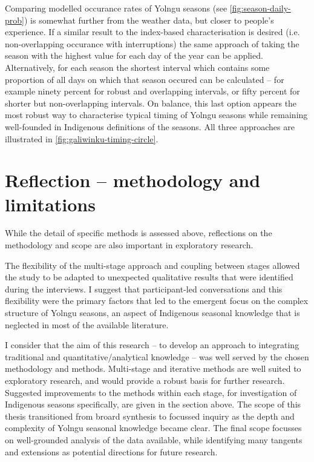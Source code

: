 Comparing modelled occurance rates of Yolngu seasons (see \cref{fig:season-daily-prob}) is somewhat
further from the weather data, but closer to people's experience.  If a similar
result to the index-based characterisation is desired (i.e. non-overlapping occurance
with interruptions) the same approach of taking the season
with the highest value for each day of the year can be applied.
%
Alternatively, for each season the shortest interval which contains some
proportion of all days on which that season occured can be calculated --
for example ninety percent for robust and overlapping intervals, or fifty percent for
shorter but non-overlapping intervals.  On balance, this last option
appears the most robust way to characterise typical timing of Yolngu seasons while
remaining well-founded in Indigenous definitions of the seasons.
%
All three approaches are illustrated in \cref{fig:galiwinku-timing-circle}.



\section{Reflection -- methodology and limitations}
\label{sec:disc-reflection}

While the detail of specific methods is assessed above, reflections on the
methodology and scope are also important in exploratory research.

The flexibility of the multi-stage approach and coupling between stages
allowed the study to be adapted to unexpected qualitative results that were
identified during the interviews.  I suggest
that participant-led conversations and this flexibility were the primary
factors that led to the emergent focus on the complex structure of
Yolngu seasons, an aspect of Indigenous seasonal knowledge that is neglected
in most of the available literature.

I consider that the aim of this research -- to develop an approach to
integrating traditional and quantitative/analytical knowledge -- was well
served by the chosen methodology and methods.  Multi-stage and iterative
methods are well suited to exploratory research, and would provide a robust
basis for further research.  Suggested improvements to the methods within
each stage, for investigation of Indigenous seasons specifically, are given
in the section above.  The scope of this thesis transitioned from broard
synthesis to focussed inquiry as the depth and complexity of Yolngu seasonal
knowledge became clear.  The final scope focusses on well-grounded analysis
of the data available, while identifying many tangents and extensions as
potential directions for future research.

